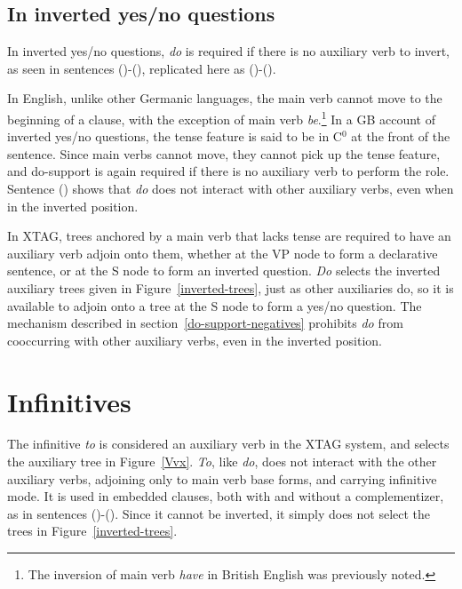
\subsection{In inverted yes/no questions}

In inverted yes/no questions, {\it do} is required if there is no auxiliary
verb to invert, as seen in sentences ()-(), replicated here
as ()-().


In English, unlike other Germanic languages, the main verb cannot move to the
beginning of a clause, with the exception of main verb {\it be}.\footnote{The
inversion of main verb {\it have} in British English was previously noted.}  In
a GB account of inverted yes/no questions, the tense feature is said to be in
C$^{0}$ at the front of the sentence.  Since main verbs cannot move, they
cannot pick up the tense feature, and do-support is again required if there is
no auxiliary verb to perform the role.  Sentence () shows that {\it do}
does not interact with other auxiliary verbs, even when in the inverted
position.

In XTAG, trees anchored by a main verb that lacks tense are required to have an
auxiliary verb adjoin onto them, whether at the VP node to form a declarative
sentence, or at the S node to form an inverted question.  {\it Do} selects the
inverted auxiliary trees given in Figure~\ref{inverted-trees}, just as other
auxiliaries do, so it is available to adjoin onto a tree at the S node to form
a yes/no question.  The mechanism described in
section~\ref{do-support-negatives} prohibits {\it do} from cooccurring with
other auxiliary verbs, even in the inverted position.


\section{Infinitives}

The infinitive {\it to} is considered an auxiliary verb in the XTAG system, and
selects the auxiliary tree in Figure~\ref{Vvx}.  {\it To}, like {\it do}, does
not interact with the other auxiliary verbs, adjoining only to main verb base
forms, and carrying infinitive mode.  It is used in embedded clauses, both with
and without a complementizer, as in sentences ()-().  Since it
cannot be inverted, it simply does not select the trees in
Figure~\ref{inverted-trees}.

